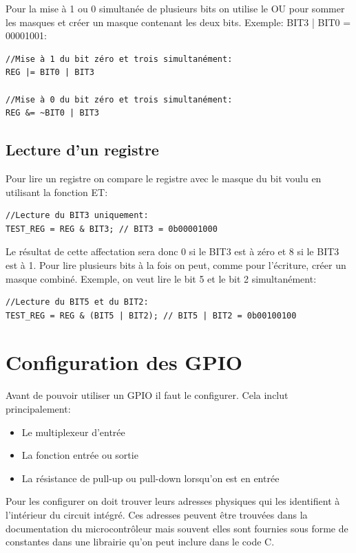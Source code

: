 Pour la mise à 1 ou 0 simultanée de plusieurs bits on utilise le OU pour sommer les masques et créer un masque contenant les deux bits. Exemple: BIT3 | BIT0 = 00001001:

\lstset{style=customc}
\begin{lstlisting}
//Mise à 1 du bit zéro et trois simultanément:
REG |= BIT0 | BIT3

//Mise à 0 du bit zéro et trois simultanément:
REG &= ~BIT0 | BIT3
\end{lstlisting}

\subsection{Lecture d'un registre}

Pour lire un registre on compare le registre avec le masque du bit voulu en utilisant la fonction ET: 

\lstset{style=customc}
\begin{lstlisting}
//Lecture du BIT3 uniquement:
TEST_REG = REG & BIT3; // BIT3 = 0b00001000
\end{lstlisting}

Le résultat de cette affectation sera donc 0 si le BIT3 est à zéro et 8 si le BIT3 est à 1. Pour lire plusieurs bits à la fois on peut, comme pour l'écriture, créer un masque combiné. Exemple, on veut lire le bit 5 et le bit 2 simultanément:

\lstset{style=customc}
\begin{lstlisting}
//Lecture du BIT5 et du BIT2:
TEST_REG = REG & (BIT5 | BIT2); // BIT5 | BIT2 = 0b00100100
\end{lstlisting}

\section{Configuration des GPIO}

Avant de pouvoir utiliser un GPIO il faut le configurer. Cela inclut principalement:

\begin{itemize}[label=\textbullet,font=\small]
\item Le multiplexeur d'entrée
\item La fonction entrée ou sortie
\item La résistance de pull-up ou pull-down lorsqu'on est en entrée
\end{itemize}

Pour les configurer on doit trouver leurs adresses physiques qui les identifient à l'intérieur du circuit intégré. Ces adresses peuvent être trouvées dans la documentation du microcontrôleur mais souvent elles sont fournies sous forme de constantes dans une librairie qu'on peut inclure dans le code C.

